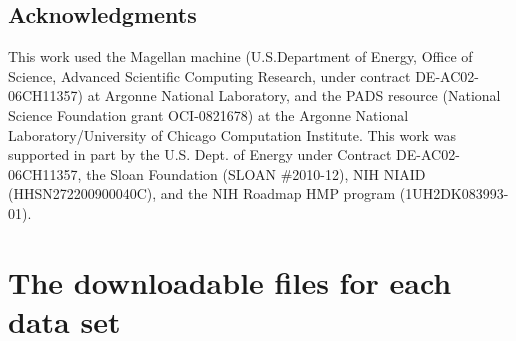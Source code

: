 \documentclass[12pt,fullpage]{report}
\begin{document}
\section*{Acknowledgments}

This work used the Magellan machine (U.S.Department of Energy, Office of Science, 
Advanced Scientific Computing Research, under contract  DE-AC02-06CH11357) at Argonne National Laboratory, and the PADS resource (National Science Foundation grant OCI-0821678) at the Argonne National Laboratory/University of Chicago Computation Institute. This work was supported in part by the U.S. Dept. of Energy under Contract DE-AC02-06CH11357, the Sloan Foundation (SLOAN \#2010-12), NIH NIAID (HHSN272200900040C), and the NIH Roadmap HMP program (1UH2DK083993-01).

\appendix
\chapter{The downloadable files for each data set}
\label{chapter:downloads}
\end{document}
